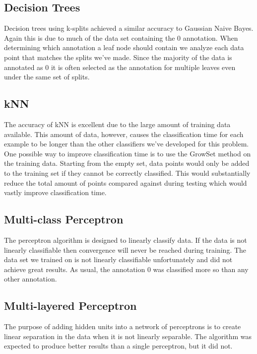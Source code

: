 \documentclass[twoside]{article}
\begin{document}
\begin{multicols}{2}
\subsection{Decision Trees}
Decision trees using k-splits achieved a similar accuracy to Gaussian Naive Bayes.  Again this is due to much of the data set containing the $0$ annotation.  When determining which annotation a leaf node should contain we analyze each data point that matches the splits we've made.  Since the majority of the data is annotated as $0$ it is often selected as the annotation for multiple leaves even under the same set of splits.

\subsection{kNN}
The accuracy of kNN is excellent due to the large amount of training data available. This amount of data, however, causes the classification time for each example to be longer than the other classifiers we've developed for this problem. One possible way to improve classification time is to use the GrowSet method on the training data.  Starting from the empty set, data points would only be added to the training set if they cannot be correctly classified.  This would substantially reduce the total amount of points compared against during testing which would vastly improve classification time.

\subsection{Multi-class Perceptron}
The perceptron algorithm is designed to linearly classify data.  If the data is not linearly classifiable then convergence will never be reached during training.  The data set we trained on is not linearly classifiable unfortunately and did not achieve great results.  As usual, the annotation $0$ was classified more so than any other annotation.

\subsection{Multi-layered Perceptron}
The purpose of adding hidden units into a network of perceptrons is to create linear separation in the data when it is not linearly separable.  The algorithm was expected to produce better results than a single perceptron, but it did not.  


\end{multicols}
\end{document}
